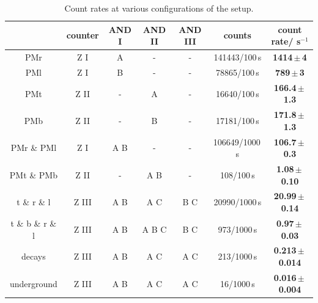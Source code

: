 \begin{table}[H]
\caption{Count rates at various configurations of the setup.}
\begin{center}
\begin{tabular}{|c||c|c|c|c|c|c|}
  \hline 
  					& counter	& AND I	& AND II	& AND III	& counts				& count rate\footnotemark/ s$^{-1}$			\\ \hline \hline
  PMr				& Z I		& A		& -			& -			& 141443/100\,s			& \textbf{1414\,$\pm$\,4}					\\ \hline
  PMl				& Z I		& B		& -			& -			& 78865/100\,s			& \textbf{789\,$\pm$\,3}					\\ \hline
  PMt				& Z II		& -		& A			& -			& 16640/100\,s			& \textbf{166.4\,$\pm$\,1.3}				\\ \hline
  PMb				& Z II		& -		& B			& -			& 17181/100\,s			& \textbf{171.8\,$\pm$\,1.3}				\\ \hline
  PMr \& PMl		& Z I		& A B	& -			& -			& 106649/1000\,s		& \textbf{106.7\,$\pm$\,0.3}				\\ \hline
  PMt \& PMb		& Z II		& -		& A B		& -			& 108/100\,s			& \textbf{1.08\,$\pm$\,0.10}				\\ \hline
  t \& r \& l		& Z III		& A B	& A	C		& B C		& 20990/1000\,s			& \textbf{20.99\,$\pm$\,0.14}				\\ \hline
  t \& b \& r \& l  & Z III		& A B	& A	B C		& B C		& 973/1000\,s			& \textbf{0.97\,$\pm$\,0.03}				\\ \hline
  decays			& Z III		& A B	& A	C		& A C		& 213/1000\,s			& \textbf{0.213\,$\pm$\,0.014}				\\ \hline
  underground\footnotemark		& Z III		& A B	& A	C		& A C		& 16/1000\,s			& \textbf{0.016\,$\pm$\,0.004}				\\ \hline
\end{tabular}
\end{center}
\label{tab:countrates}
\end{table}

\addtocounter{footnote}{-1}
\addtocounter{footnote}{1}
